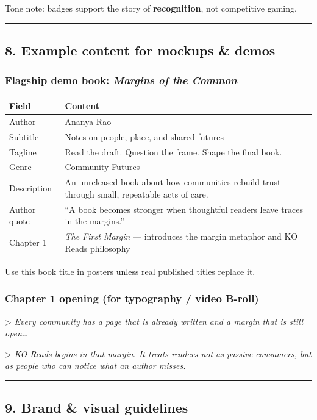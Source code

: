 \documentclass[11pt,a4paper]{report}
\begin{document}
Tone note: badges support the story of \textbf{recognition}, not competitive gaming.


\medskip\hrule\medskip

\subsection{8. Example content for mockups \& demos}

\subsubsection{Flagship demo book: \textit{Margins of the Common}}

\begin{longtable}{|l|l|}
\hline
Field & Content \\ \hline
Author & Ananya Rao \\ \hline
Subtitle & Notes on people, place, and shared futures \\ \hline
Tagline & Read the draft. Question the frame. Shape the final book. \\ \hline
Genre & Community Futures \\ \hline
Description & An unreleased book about how communities rebuild trust through small, repeatable acts of care. \\ \hline
Author quote & “A book becomes stronger when thoughtful readers leave traces in the margins.” \\ \hline
Chapter 1 & \textit{The First Margin} --- introduces the margin metaphor and KO Reads philosophy \\
\hline
\end{longtable}


Use this book title in posters unless real published titles replace it.


\subsubsection{Chapter 1 opening (for typography / video B-roll)}

> \textit{Every community has a page that is already written and a margin that is still open…}


> \textit{KO Reads begins in that margin. It treats readers not as passive consumers, but as people who can notice what an author misses.}


\medskip\hrule\medskip

\subsection{9. Brand \& visual guidelines}
\end{document}
